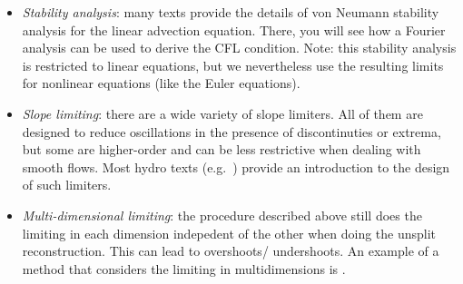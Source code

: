 \begin{itemize}
\item {\em Stability analysis}: many texts provide the details of von
  Neumann stability analysis for the linear advection equation.
  There, you will see how a Fourier analysis can be used to derive the
  CFL condition.  Note: this stability analysis is restricted to
  linear equations, but we nevertheless use the resulting limits for
  nonlinear equations (like the Euler equations).

\item {\em Slope limiting}: there are a wide variety of slope limiters.
  All of them are designed to reduce oscillations in the presence
  of discontinuties or extrema, but some are higher-order and can be
  less restrictive when dealing with smooth flows.  Most hydro
  texts (e.g.\ \cite{leveque:2002,toro:1997}) provide an introduction to the design
  of such limiters.

\item {\em Multi-dimensional limiting}: the procedure described above
  still does the limiting in each dimension indepedent of the other
  when doing the unsplit reconstruction.  This can lead to overshoots/
  undershoots.  An example of a method that considers the limiting
  in multidimensions is \cite{BDS,quadBDS}.

\end{itemize}

